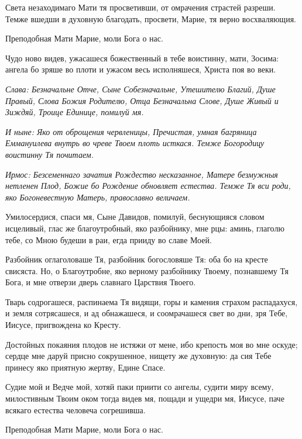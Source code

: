 \normalfont{}

Света незаходимаго Мати тя просветивши, от омрачения страстей разреши. Темже вшедши в духовную благодать, просвети, Марие, тя верно восхваляющия. 

\bfseries 

Преподобная Мати Марие, моли Бога о нас.

\normalfont{}

Чудо ново видев, ужасашеся божественный в тебе воистинну, мати, Зосима: ангела бо зряше во плоти и ужасом весь исполняшеся, Христа поя во веки. 

\itshape Слава\normalfont{}: Безначальне Отче, Сыне Собезначальне, Утешителю Благий, Душе Правый, Слова Божия Родителю, Отца Безначальна Слове, Душе Живый и Зиждяй, Троице Единице, помилуй мя. 

\itshape И ныне\normalfont{}: Яко от оброщения червленицы, Пречистая, умная багряница Еммануилева внутрь во чреве Твоем плоть исткася. Темже Богородицу воистинну Тя почитаем.



\itshape Ирмос\normalfont{}: Безсеменнаго зачатия Рождество несказанное, Матере безмужныя нетленен Плод, Божие бо Рождение обновляет естества. Темже Тя вси роди, яко Богоневестную Матерь, православно величаем. 

Умилосердися, спаси мя, Сыне Давидов, помилуй, беснующияся словом исцеливый, глас же благоутробный, яко разбойнику, мне рцы: аминь, глаголю тебе, со Мною будеши в раи, егда прииду во славе Моей. 

Разбойник оглаголоваше Тя, разбойник богословяше Тя: оба бо на кресте свисяста. Но, о Благоутробне, яко верному разбойнику Твоему, познавшему Тя Бога, и мне отверзи дверь славнаго Царствия Твоего. 

Тварь содрогашеся, распинаема Тя видящи, горы и камения страхом распадахуся, и земля сотрясашеся, и ад обнажашеся, и соомрачашеся свет во дни, зря Тебе, Иисусе, пригвождена ко Кресту. 

Достойных покаяния плодов не истяжи от мене, ибо крепость моя во мне оскуде; сердце мне даруй присно сокрушенное, нищету же духовную: да сия Тебе принесу яко приятную жертву, Едине Спасе. 

Судие мой и Ведче мой, хотяй паки приити со ангелы, судити миру всему, милостивным Твоим оком тогда видев мя, пощади и ущедри мя, Иисусе, паче всякаго естества человеча согрешивша. 

\bfseries 

Преподобная Мати Марие, моли Бога о нас.

